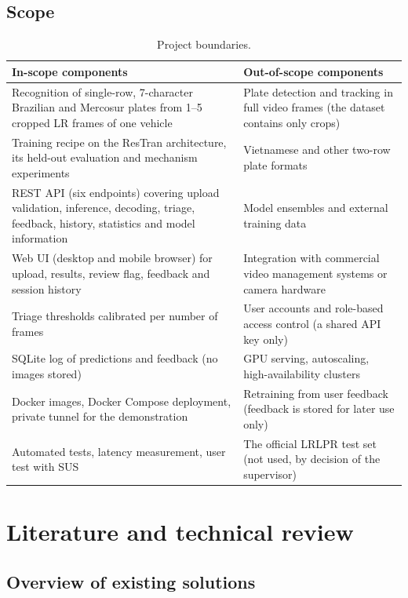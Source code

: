 \documentclass[11pt,a4paper]{article}
\begin{document}
\subsection{Scope}

\begin{table}[H]
\centering\small
\caption{Project boundaries.}\label{tab:scope}
\begin{tabularx}{\textwidth}{@{}LL@{}}
\toprule
In-scope components & Out-of-scope components \\
\midrule
Recognition of single-row, 7-character Brazilian and Mercosur plates from 1--5 cropped LR frames of one vehicle & Plate detection and tracking in full video frames (the dataset contains only crops) \\
Training recipe on the ResTran architecture, its held-out evaluation and mechanism experiments & Vietnamese and other two-row plate formats \\
REST API (six endpoints) covering upload validation, inference, decoding, triage, feedback, history, statistics and model information & Model ensembles and external training data \\
Web UI (desktop and mobile browser) for upload, results, review flag, feedback and session history & Integration with commercial video management systems or camera hardware \\
Triage thresholds calibrated per number of frames & User accounts and role-based access control (a shared API key only) \\
SQLite log of predictions and feedback (no images stored) & GPU serving, autoscaling, high-availability clusters \\
Docker images, Docker Compose deployment, private tunnel for the demonstration & Retraining from user feedback (feedback is stored for later use only) \\
Automated tests, latency measurement, user test with SUS & The official LRLPR test set (not used, by decision of the supervisor) \\
\bottomrule
\end{tabularx}
\end{table}

\section{Literature and technical review}

\subsection{Overview of existing solutions}
\end{document}
